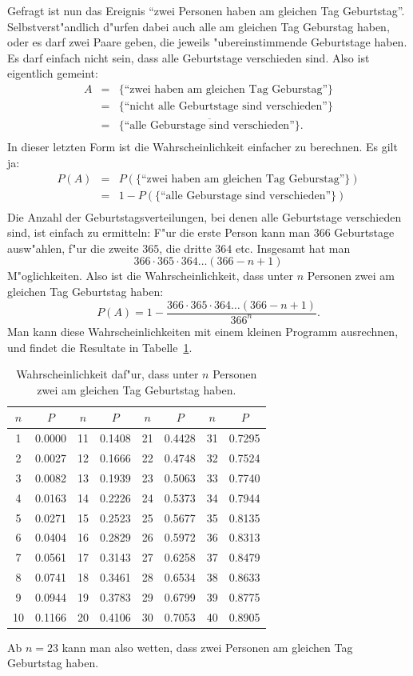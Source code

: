 Gefragt ist nun das Ereignis
``zwei Personen haben am gleichen Tag Geburtstag''. 
Selbstverst"andlich d"urfen dabei auch alle am gleichen Tag
Geburstag haben, oder es darf zwei Paare geben, die jeweils
"ubereinstimmende Geburtstage haben. Es darf einfach nicht
sein, dass alle Geburtstage verschieden sind. Also ist eigentlich
gemeint:
\begin{eqnarray*}
A&=&\{\text{``zwei haben am gleichen Tag Geburstag''}\}\\
&=&\{\text{``nicht alle Geburtstage sind verschieden''}\}\\
&=&\overline{\{\text{``alle Geburstage sind verschieden''}\}}.\\
\end{eqnarray*}
In dieser letzten Form ist die Wahrscheinlichkeit einfacher zu
berechnen. Es gilt ja:
\begin{eqnarray*}
P(A)&=&P(\{\text{``zwei haben am gleichen Tag Geburstag''}\})\\
&=&1-P(\{\text{``alle Geburstage sind verschieden''}\})\\
\end{eqnarray*}
Die Anzahl der Geburtstagsverteilungen, bei denen alle Geburtstage
verschieden sind, ist einfach zu ermitteln: F"ur die erste Person
kann man $366$ Geburtstage ausw"ahlen, f"ur die zweite $365$, die
dritte $364$ etc. Insgesamt hat man
\[
366\cdot365\cdot364\dots(366-n+1)
\]
M"oglichkeiten. Also ist die Wahrscheinlichkeit, dass unter $n$
Personen zwei am gleichen Tag Geburtstag haben:
\[
P(A)=1-\frac{366\cdot365\cdot364\dots(366-n+1)}{366^n}.
\]
Man kann diese Wahrscheinlichkeiten mit einem kleinen Programm
ausrechnen, und findet die Resultate in
Tabelle~\ref{geburtstagswahrscheinlichkeit}.
\begin{table}
\begin{center}
\begin{tabular}{|c|c|c|c|c|c|c|c|}
\hline
$n$&$P$&$n$&$P$&$n$&$P$&$n$&$P$\\
\hline
1&0.0000
&11&0.1408
&21&0.4428
&31&0.7295\\
2&0.0027
&12&0.1666
&22&0.4748
&32&0.7524\\
3&0.0082
&13&0.1939
&23&0.5063
&33&0.7740\\
4&0.0163
&14&0.2226
&24&0.5373
&34&0.7944\\
5&0.0271
&15&0.2523
&25&0.5677
&35&0.8135\\
6&0.0404
&16&0.2829
&26&0.5972
&36&0.8313\\
7&0.0561
&17&0.3143
&27&0.6258
&37&0.8479\\
8&0.0741
&18&0.3461
&28&0.6534
&38&0.8633\\
9&0.0944
&19&0.3783
&29&0.6799
&39&0.8775\\
10&0.1166
&20&0.4106
&30&0.7053
&40&0.8905\\
\hline
\end{tabular}
\end{center}
\caption{Wahrscheinlichkeit daf"ur, dass unter $n$ Personen zwei
am gleichen Tag Geburtstag haben.\label{geburtstagswahrscheinlichkeit}}
\end{table}
Ab $n=23$ kann man also wetten, dass zwei Personen am gleichen Tag
Geburtstag haben.

